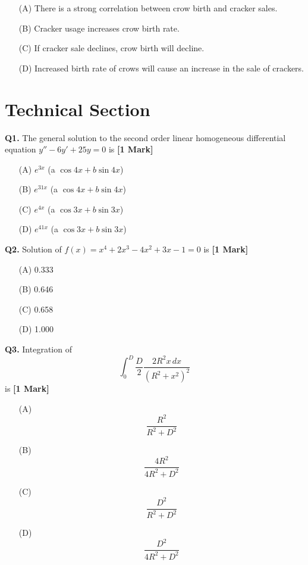 \documentclass[11pt]{article}
\newcommand{\questiona}[2]{
    \noindent\textbf{Q#2.} #1 \hfill \textbf{[1 Mark]}
}
\begin{document}
\begin{enumerate}
    \item[(A)] There is a strong correlation between crow birth and cracker sales.
    \item[(B)] Cracker usage increases crow birth rate.
    \item[(C)] If cracker sale declines, crow birth will decline.
    \item[(D)] Increased birth rate of crows will cause an increase in the sale of crackers.
\end{enumerate}
\vspace{0.5cm}

\section*{Technical Section}

\questiona{The general solution to the second order linear homogeneous differential equation \( y'' - 6y' + 25y = 0 \) is}{1}
\begin{enumerate}
    \item[(A)] \( e^{3x} \) (a \(\cos 4x + b \sin 4x\))  
    \item[(B)] \( e^{31x} \) (a \(\cos 4x + b \sin 4x\))  
    \item[(C)] \( e^{4x} \) (a \(\cos 3x + b \sin 3x\))  
    \item[(D)] \( e^{41x} \) (a \(\cos 3x + b \sin 3x\))  
\end{enumerate}
\vspace{0.5cm}

\questiona{Solution of \( f(x) = x^4 + 2x^3 - 4x^2 + 3x - 1 = 0 \) is}{2}
\begin{enumerate}
    \item[(A)] 0.333  
    \item[(B)] 0.646  
    \item[(C)] 0.658  
    \item[(D)] 1.000  
\end{enumerate}
\vspace{0.5cm}

\questiona{Integration of \[ \int_0^D \frac{D}{2} \frac{2R^2 x \, dx}{(R^2 + x^2)^2} \] is}{3}
\begin{enumerate}
    \item[(A)] \[ \frac{R^2}{R^2 + D^2} \]  
    \item[(B)] \[ \frac{4R^2}{4R^2 + D^2} \]  
    \item[(C)] \[ \frac{D^2}{R^2 + D^2} \]  
    \item[(D)] \[ \frac{D^2}{4R^2 + D^2} \]  
\end{enumerate}
\vspace{0.5cm}
\end{document}

